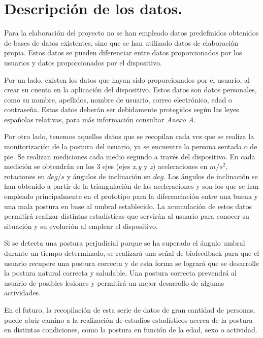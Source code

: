 
\section{Descripción de los datos.}

Para la elaboración del proyecto no se han empleado datos predefinidos obtenidos de bases de datos existentes, sino que se han utilizado datos de elaboración propia. Estos datos se pueden diferenciar entre datos proporcionados por los usuarios y datos proporcionados por el dispositivo.

Por un lado, existen los datos que hayan sido proporcionados por el usuario, al crear su cuenta en la aplicación del dispositivo. Estos datos son datos personales, como su nombre, apellidos, nombre de usuario, correo electrónico, edad o contraseña. Estos datos deberán ser debidamente protegidos según las leyes españolas relativas, para más información consultar \textit{Anexo A}.

Por otro lado, tenemos aquellos datos que se recopilan cada vez que se realiza la monitorización de la postura del usuario, ya se encuentre la persona sentada o de pie. Se realizan mediciones cada medio segundo a través del dispositivo. En cada medición se obtendrán en los 3 ejes (ejes \textit{x},\textit{y} y \textit{z}) aceleraciones en $m/s^{2}$, rotaciones en $deg/s$ y ángulos de inclinación en $deg$. Los ángulos de inclinación se han obtenido a partir de la triangulación de las aceleraciones y son los que se han empleado principalmente en el prototipo para la diferenciación entre una buena y una mala postura en base al umbral establecido. La acumulación de estos datos permitirá realizar distintas estadísticas que servirán al usuario para conocer su situación y su evolución al emplear el dispositivo.

Si se detecta una postura perjudicial porque se ha superado el ángulo umbral durante un tiempo determinado, se realizará una señal de biofeedback para que el usuario recupere una postura correcta y de esta forma se logrará que se desarrolle la postura natural correcta y saludable. Una postura correcta prevendrá al usuario de posibles lesiones y permitirá un mejor desarrollo de algunas actividades.

En el futuro, la recopilación de esta serie de datos de gran cantidad de personas, puede abrir camino a la realización de estudios estadísticos acerca de la postura en distintas condiciones, como la postura en función de la edad, sexo o actividad.

